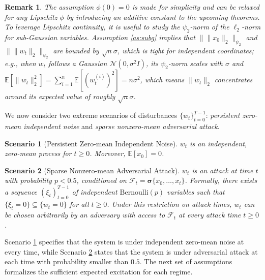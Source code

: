 \documentclass[letterpaper,10pt,conference]{ieeeconf}
\theoremstyle{plain} %
\theoremstyle{plain} %
\newtheorem{scenario}{Scenario}
\theoremstyle{plain} %
\theoremstyle{plain}
\newtheorem{remark}{Remark}
\begin{document}
\begin{remark}\label{subgnorm}
The assumption $\phi(0) = 0$ is made for simplicity and can be relaxed for any Lipschitz $\phi$ by introducing an additive constant to the upcoming theorems.
To leverage Lipschitz continuity, it is useful to  study the $\psi_2$-norm of the $\ell_2$-norm for sub-Gaussian variables.
 Assumption \ref{as:subg} implies that $\| \|x_0\|_2 \|_{\psi_2}$ and $\| \|w_t\|_2 \|_{\psi_2}$ are bounded by $\sqrt{n}\sigma$, which is tight for independent coordinates; \textit{e.g.}, when $w_t$ follows a Gaussian  $\mathcal{N}(0, \sigma^2 I)$, its $\psi_2$-norm scales with $\sigma$ and 
 $\mathbb{E}[\|w_t\|_2^2]=\sum_{i=1}^n \mathbb{E}[(w_t^{(i)})^2] = n\sigma^2$, which means $\|w_t\|_2$ concentrates around its expected value of roughly $\sqrt{n}\sigma$. 
\end{remark}

We now consider two extreme scenarios of disturbances $\{w_t\}_{t=0}^{T-1}$: \textit{persistent zero-mean independent noise} and \textit{sparse nonzero-mean adversarial attack}.  

\begin{scenario}[Persistent Zero-mean Independent Noise]\label{as:white}
     $w_t$ is an independent, zero-mean process for $t\ge0$. Moreover, $\mathbb{E}[x_0]=0$. 
\end{scenario}

\begin{scenario}[Sparse Nonzero-mean Adversarial Attack]\label{as:prob}
    $w_t$ is an attack at time $t$ with probability $p < 0.5$, conditioned on $\mathcal{F}_t= \bm{\sigma}\{x_0, \dots, x_t\}$. Formally, there exists a sequence $(\xi_t)_{t = 0}^{T-1}$ of independent $\mathrm{Bernoulli}(p)$ variables
    such that
$\{\xi_t = 0\} \subseteq \{w_t = 0\}$
for all $t\ge0$. Under this restriction on attack times, $w_t$ can be chosen arbitrarily by an adversary with access to $\mathcal{F}_t$ at every attack time $t\ge 0$.
\end{scenario}



Scenario \ref{as:white} specifies that the system is under independent zero-mean noise at every time, while Scenario \ref{as:prob} states that the system is under adversarial attack at each time with probability smaller than $0.5$.
The next set of assumptions formalizes the sufficient expected excitation for each regime. 
\end{document}
